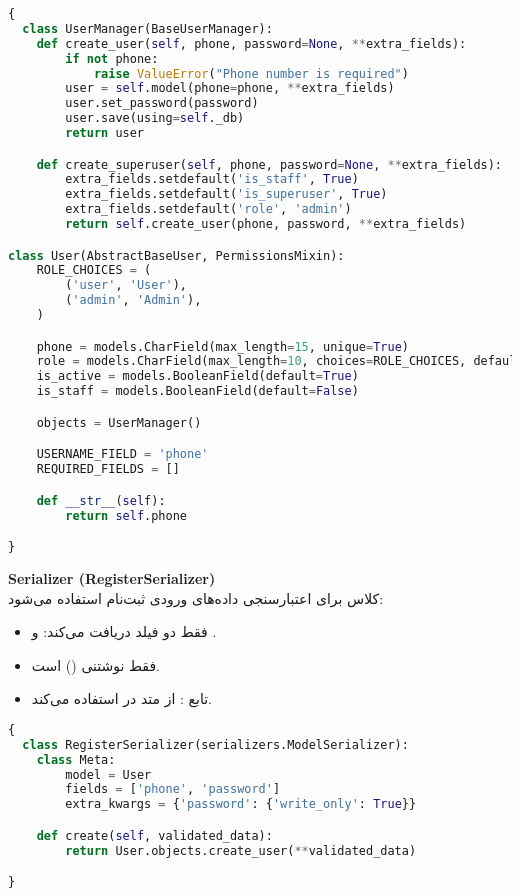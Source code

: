\documentclass{report}
\begin{document}
\begin{lstlisting}[language=python]
{
  class UserManager(BaseUserManager):
    def create_user(self, phone, password=None, **extra_fields):
        if not phone:
            raise ValueError("Phone number is required")
        user = self.model(phone=phone, **extra_fields)
        user.set_password(password)
        user.save(using=self._db)
        return user

    def create_superuser(self, phone, password=None, **extra_fields):
        extra_fields.setdefault('is_staff', True)
        extra_fields.setdefault('is_superuser', True)
        extra_fields.setdefault('role', 'admin')
        return self.create_user(phone, password, **extra_fields)

class User(AbstractBaseUser, PermissionsMixin):
    ROLE_CHOICES = (
        ('user', 'User'),
        ('admin', 'Admin'),
    )

    phone = models.CharField(max_length=15, unique=True)
    role = models.CharField(max_length=10, choices=ROLE_CHOICES, default='user')
    is_active = models.BooleanField(default=True)
    is_staff = models.BooleanField(default=False)

    objects = UserManager()

    USERNAME_FIELD = 'phone'
    REQUIRED_FIELDS = []

    def __str__(self):
        return self.phone

}
\end{lstlisting}


\textbf{Serializer (RegisterSerializer)} \\
کلاس  برای اعتبارسنجی داده‌های ورودی ثبت‌نام استفاده می‌شود:
\begin{itemize}
  \item فقط دو فیلد دریافت می‌کند:  و .
  \item {} فقط نوشتنی () است.
  \item تابع : از متد  در  استفاده می‌کند.
\end{itemize}

\begin{lstlisting}[language=python ]
{
  class RegisterSerializer(serializers.ModelSerializer):
    class Meta:
        model = User
        fields = ['phone', 'password']
        extra_kwargs = {'password': {'write_only': True}}

    def create(self, validated_data):
        return User.objects.create_user(**validated_data)

}
\end{lstlisting}
\end{document}
